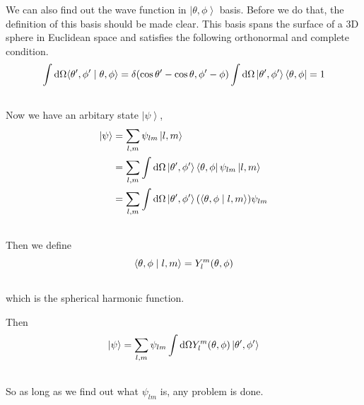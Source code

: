 \documentclass[letterpaper,10pt,english]{sphinxmanual}
\newcommand{\bra}[1]{\left\langle #1\right|}
\newcommand{\ket}[1]{\left| #1\right\rangle}
\newcommand{\braket}[2]{\langle #1 \mid #2 \rangle}
\begin{document}
We can also find out the wave function in ${\ket{\theta,\phi } }$ basis. Before we do that, the definition of this basis should be made clear. This basis spans the surface of a 3D sphere in Euclidean space and satisfies the following orthonormal and complete condition.
\begin{gather}
\begin{split}\int \mathrm d \Omega \braket{\theta',\phi'}{\theta,\phi} = \delta(\cos\theta'-\cos\theta,\phi'-\phi)
\int \mathrm d \Omega \ket{\theta',\phi'}\bra{\theta,\phi} = 1\end{split}\notag\\\begin{split}\end{split}\notag
\end{gather}
Now we have an arbitary state $\ket{\psi}$,
\begin{gather}
\begin{split}\ket{\psi} &= \sum _ {l,m} \psi _ {lm}\ket{l,m} \\
           &= \sum _ {l,m} \int \mathrm d \Omega \ket{\theta',\phi'}\bra{\theta,\phi} \psi _ {lm}\ket{l,m} \\
           &= \sum _ {l,m} \int \mathrm d \Omega \ket{\theta',\phi'} (\braket{\theta,\phi}{l,m} ) \psi _ {lm} \\\end{split}\notag\\\begin{split}\end{split}\notag
\end{gather}
Then we define
\begin{gather}
\begin{split}\braket{\theta,\phi}{l,m}=Y_l^m(\theta,\phi)\end{split}\notag\\\begin{split}\end{split}\notag
\end{gather}
which is the spherical harmonic function.

Then
\begin{gather}
\begin{split}\ket{\psi} &= \sum _ {l,m} \psi _ {lm} \int \mathrm d \Omega   Y_l^m(\theta,\phi) \ket{\theta',\phi'}  \\\end{split}\notag\\\begin{split}\end{split}\notag
\end{gather}
So as long as we find out what $\psi _ {lm}$ is, any problem is done.
\end{document}
